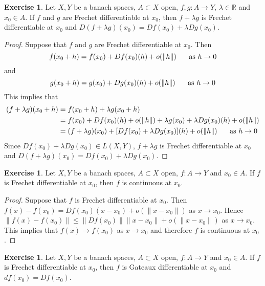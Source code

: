 \documentclass[12pt]{amsart}
\theoremstyle{definition}
\newtheorem{ex}[definition]{Exercise}
\newcommand{\lam}{\lambda}
\newcommand{\R}{\mathbb{R}}
\newcommand{\lex}[1]{\label{ex:#1}}
\begin{document}
	\begin{ex} \lex{62004}
	Let $X, Y$ be a banach spaces, $A \subset X$ open, $f,g:A \rightarrow Y$, $\lam \in \R$ and $x_0 \in A$. If $f$ and $g$ are Frechet differentiable at $x_0$, then $f+ \lam g$ is Frechet differentiable at $x_0$ and $D(f+\lam g)(x_0) = Df(x_0) + \lam Dg(x_0)$.
	\end{ex}
	
	\begin{proof}
	Suppose that $f$ and $g$ are Frechet differentiable at $x_0$. Then $$f(x_0 + h) = f(x_0) + Df(x_0)(h) + o(\|h\| ) \hspace{.5cm} \text{ as } h \rightarrow 0$$  and $$g(x_0 + h) = g(x_0) + Dg(x_0)(h) + o(\|h\| ) \hspace{.5cm} \text{ as } h \rightarrow 0$$  
	This implies that 
	\begin{align*}
	(f+\lam g)(x_0 + h) 
	&= f(x_0 + h) +\lam g(x_0 + h) \\
	&= f(x_0) + Df(x_0)(h) + o(\|h\| ) + \lam g(x_0) + \lam Dg(x_0)(h) + o(\|h\| ) \\
	&= (f+\lam g)(x_0) + [Df(x_0)+ \lam Dg(x_0)](h) + o(\|h\|) \hspace{.5cm} \text{ as } h \rightarrow 0
	\end{align*}
	Since $Df(x_0)+\lam Dg(x_0) \in L(X,Y)$, $f+\lam g$ is Frechet differentiable at $x_0$ and $D(f+\lam g)(x_0) = Df(x_0) + \lam Dg(x_0)$. 
	\end{proof}
	
	\begin{ex}\lex{62004.5}
	Let $X, Y$ be a banach spaces, $A \subset X$ open, $f:A \rightarrow Y$ and $x_0 \in A$. If $f$ is Frechet differentiable at $x_0$, then $f$ is continuous at $x_0$. 
	\end{ex}
	
	\begin{proof}
	Suppose that $f$ is Frechet differentiable at $x_0$. Then $f(x) - f(x_0) = Df(x_0)(x - x_0) + o(\|x - x_0\|)$ as $x \rightarrow x_0$. Hence $\|f(x) - f(x_0)\| \leq \| Df(x_0)\| \|x - x_0 \| + o(\|x - x_0\|)$ as $x \rightarrow x_0$. This implies that $f(x) \rightarrow f(x_0)$ as $x \rightarrow x_0$ and therefore $f$ is continuous at $x_0$.
	\end{proof}
	
	\begin{ex} \lex{62005}
	Let $X, Y$ be a banach spaces, $A \subset X$ open, $f:A \rightarrow Y$ and $x_0 \in A$. If $f$ is Frechet differentiable at $x_0$, then $f$ is Gateaux differentiable at $x_0$ and $df(x_0) = Df(x_0)$.
	\end{ex}
	
\end{document}
